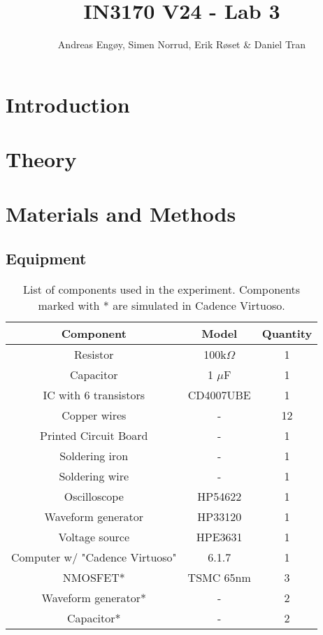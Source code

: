 \documentclass[onecolumn]{article}
\title{IN3170 V24 - Lab 3}
\author{Andreas Engøy, Simen Norrud, Erik Røset \& Daniel Tran}
\date{\monthname[\the\month] \the\year}
\begin{document}
\maketitle
\tableofcontents

\section{Introduction}

\section{Theory}

\subsection{}



\section{Materials and Methods}
\subsection{Equipment}
\begin{table}[h!]
    \centering
    \begin{tabular}{|c|c|c|}
        \hline
        \textbf{Component} & \textbf{Model} & \textbf{Quantity} \\
        \hline
        Resistor & 100k$\Omega$ & 1 \\
        Capacitor & 1 $\mu$F & 1 \\
        IC with 6 transistors & CD4007UBE & 1 \\
        Copper wires & - & 12 \\
        Printed Circuit Board & - & 1 \\
        Soldering iron & - & 1 \\
        Soldering wire & - & 1 \\
        Oscilloscope & HP54622 & 1 \\
        Waveform generator  & HP33120 & 1 \\
        Voltage source & HPE3631 & 1 \\
        Computer w/ "Cadence Virtuoso" & 6.1.7 & 1 \\
        NMOSFET* & TSMC 65nm & 3 \\
        Waveform generator* & - & 2 \\ 
        Capacitor* & - & 2 \\
        \hline
    \end{tabular}
    \caption{List of components used in the experiment. Components marked with * are simulated in Cadence Virtuoso.}
    \label{tab:bom}
\end{table}
\end{document}
